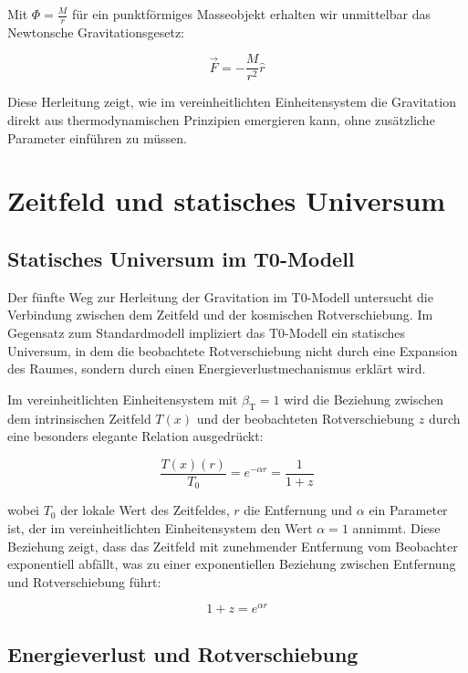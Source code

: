 \documentclass[12pt,a4paper]{article}
\newcommand{\Tfield}{T(x)}
\newcommand{\Tzero}{T_0}
\newcommand{\betaT}{\beta_{\text{T}}}
\begin{document}
	Mit \(\Phi = \frac{M}{r}\) für ein punktförmiges Masseobjekt erhalten wir unmittelbar das Newtonsche Gravitationsgesetz:
	
	\begin{equation}
		\vec{F} = -\frac{M}{r^2} \hat{r}
	\end{equation}
	
	Diese Herleitung zeigt, wie im vereinheitlichten Einheitensystem die Gravitation direkt aus thermodynamischen Prinzipien emergieren kann, ohne zusätzliche Parameter einführen zu müssen.
	
	\section{Zeitfeld und statisches Universum}
	
	\subsection{Statisches Universum im T0-Modell}
	
	Der fünfte Weg zur Herleitung der Gravitation im T0-Modell untersucht die Verbindung zwischen dem Zeitfeld und der kosmischen Rotverschiebung. Im Gegensatz zum Standardmodell impliziert das T0-Modell ein statisches Universum, in dem die beobachtete Rotverschiebung nicht durch eine Expansion des Raumes, sondern durch einen Energieverlustmechanismus erklärt wird.
	

	Im vereinheitlichten Einheitensystem mit \(\betaT = 1\) wird die Beziehung zwischen dem intrinsischen Zeitfeld \(\Tfield\) und der beobachteten Rotverschiebung \(z\) durch eine besonders elegante Relation ausgedrückt:
	
	\begin{equation}
		\frac{\Tfield(r)}{\Tzero} = e^{-\alpha r} = \frac{1}{1+z}
	\end{equation}
	
	wobei \(\Tzero\) der lokale Wert des Zeitfeldes, \(r\) die Entfernung und \(\alpha\) ein Parameter ist, der im vereinheitlichten Einheitensystem den Wert \(\alpha = 1\) annimmt. Diese Beziehung zeigt, dass das Zeitfeld mit zunehmender Entfernung vom Beobachter exponentiell abfällt, was zu einer exponentiellen Beziehung zwischen Entfernung und Rotverschiebung führt:
	
	\begin{equation}
		1 + z = e^{\alpha r}
	\end{equation}
	
	\subsection{Energieverlust und Rotverschiebung}
	
\end{document}
